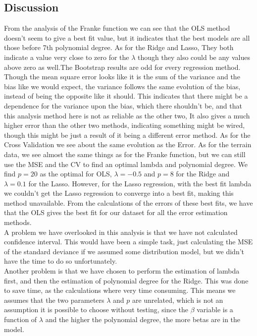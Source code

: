 \documentclass[11pt, A4paper, english]{article}
\begin{document}
\begin{multicols}{2}
		\section{Discussion}
From the analysis of the Franke function we can see that the OLS method doesn't seem to give a best fit value, but it indicates that the best models are all those before 7th polynomial degree. As for the Ridge and Lasso, They both indicate a value very close to zero for the $\lambda$ though they also could be any values above zero as well.The Bootstrap results are odd for every regression method. Though the mean square error looks like it is the sum of the variance and the bias like we would expect, the variance follows the same evolution of the bias, instead of being the opposite like it should. This indicates that there might be a dependence for the variance upon the bias, which there shouldn't be, and that this analysis method here is not as reliable as the other two, It also gives a much higher error than the other two methods, indicating something might be wired, though this might be just a result of it being a different error method. As for the Cross Validation we see about the same evolution as the Error. As for the terrain data, we see almost the same things as for the Franke function, but we can still use the MSE and the CV to find an optimal lambda and polynomial degree. We find $p = 20$ as the optimal for OLS, $\lambda = -0.5$ and $p = 8$ for the Ridge and $\lambda = 0.1$ for the Lasso. However, for the Lasso regression, with the best fit lambda we couldn't get the Lasso regression to converge into a best fit, making this method unavailable. From the calculations of the errors of these best fits, we have that the OLS gives the best fit for our dataset for all the error estimation methods. \\
A problem we have overlooked in this analysis is that we have not calculated confidence interval. This would have been a simple task, just calculating the MSE of the standard deviance if we assumed some distribution model, but we didn't have the time to do so unfortunately. \\
Another problem is that we have chosen to perform the estimation of lambda first, and then the estimation of polynomial degree for the Ridge. This was done to save time, as the calculations where very time consuming. This means we assumes that the two parameters $\lambda$ and $p$ are unrelated, which is not an assumption it is possible to choose without testing, since the $\beta$ variable is a function of $\lambda$ and the higher the polynomial degree, the more betas are in the model.


\end{multicols}
\end{document}
